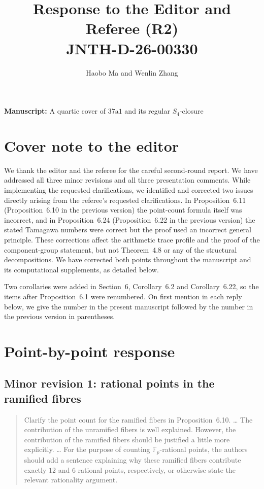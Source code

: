 \documentclass[11pt,letterpaper]{article}
\title{Response to the Editor and Referee (R2)\\
JNTH-D-26-00330}
\author{Haobo Ma and Wenlin Zhang}
\date{}
\begin{document}
\maketitle

\noindent\textbf{Manuscript:} A quartic cover of \(37\mathrm{a}1\) and its regular \(S_4\)-closure

\section*{Cover note to the editor}

We thank the editor and the referee for the careful second-round report. We have addressed all three minor revisions and all three presentation comments. While implementing the requested clarifications, we identified and corrected two issues directly arising from the referee's requested clarifications. In Proposition~6.11 (Proposition~6.10 in the previous version) the point-count formula itself was incorrect, and in Proposition~6.24 (Proposition~6.22 in the previous version) the stated Tamagawa numbers were correct but the proof used an incorrect general principle. These corrections affect the arithmetic trace profile and the proof of the component-group statement, but not Theorem~4.8 or any of the structural decompositions. We have corrected both points throughout the manuscript and its computational supplements, as detailed below.

Two corollaries were added in Section~6, Corollary~6.2 and Corollary~6.22, so the items after Proposition~6.1 were renumbered. On first mention in each reply below, we give the number in the present manuscript followed by the number in the previous version in parentheses.

\section*{Point-by-point response}

\subsection*{Minor revision 1: rational points in the ramified fibres}

\begin{quote}
Clarify the point count for the ramified fibers in Proposition~6.10. \dots{} The contribution of the unramified fibers is well explained. However, the contribution of the ramified fibers should be justified a little more explicitly. \dots{} For the purpose of counting \(\mathbb F_p\)-rational points, the authors should add a sentence explaining why these ramified fibers contribute exactly \(12\) and \(6\) rational points, respectively, or otherwise state the relevant rationality argument.
\end{quote}
\end{document}
